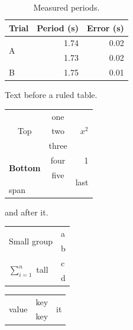 \documentclass{article}
\begin{document}
\begin{table}[h]
  \centering
  \begin{tabular}{@{}lrr@{}}
    \toprule
    Trial & Period (s) & Error (s) \\
    \midrule
    \multirow{2}{*}{A} & 1.74 & 0.02 \\
                       & 1.73 & 0.02 \\
    B & 1.75 & 0.01 \\
    \bottomrule
  \end{tabular}
  \caption{Measured periods.}
\end{table}

Text before a ruled table.
\begin{tabular}{|c|c|r|}
\hline
\multirow[t]{3}{*}{Top} & one & \multirow{3}{*}{$x^2$} \\
 & two & \\
 & three & \\
\hline
\multirow[b]{2}{*}{\textbf{Bottom}} & four & 1 \\
 & five & \multirow{2}{*}{last} \\
\multicolumn{2}{|l|}{\multirow{1}{*}{span}} & \\
\hline
\end{tabular}
and after it.

{\small
\begin{tabular}{ll}
\multirow{2}{*}{Small group} & a \\
 & b \\
\multirow[t]{2}{*}{$\displaystyle\sum_{i=1}^{n}$ tall} & c \\
 & d \\
\end{tabular}}

\begin{tabular}{@{: }l@{ -- }lr}
\multirow{2}{*}{value} & key & \multirow[t]{2}{*}{it} x \\
 & key & \\
\end{tabular}
\end{document}
